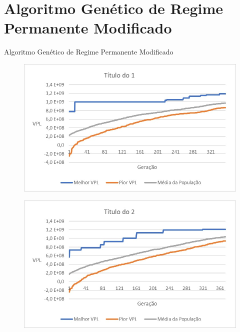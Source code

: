 \documentclass[12pt,a4paper]{report}
\begin{document}
\appendix

\chapter{Algoritmo Genético de Regime Permanente Modificado}


Algoritmo Genético de Regime Permanente Modificado

\begin{figure}[H]
\centering

\includegraphics[scale=1]{1}

\end{figure}

\begin{figure}[H]
\centering

\includegraphics[scale=1]{2}

\end{figure}
\end{document}

